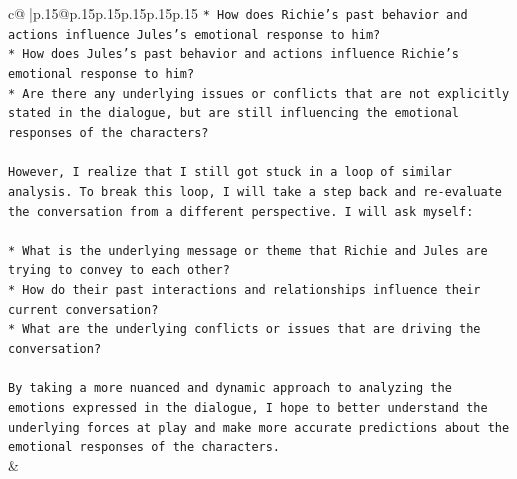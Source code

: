 \documentclass{article}
\begin{document}
{\begin{supertabular}{c@{$\;$}|p{.15\linewidth}@{}p{.15\linewidth}p{.15\linewidth}p{.15\linewidth}p{.15\linewidth}p{.15\linewidth}}
{{{\texttt{* How does Richie's past behavior and actions influence Jules's emotional response to him?} \\
\texttt{* How does Jules's past behavior and actions influence Richie's emotional response to him?} \\
\texttt{* Are there any underlying issues or conflicts that are not explicitly stated in the dialogue, but are still influencing the emotional responses of the characters?} \\
\\ 
\texttt{However, I realize that I still got stuck in a loop of similar analysis. To break this loop, I will take a step back and re{-}evaluate the conversation from a different perspective. I will ask myself:} \\
\\ 
\texttt{* What is the underlying message or theme that Richie and Jules are trying to convey to each other?} \\
\texttt{* How do their past interactions and relationships influence their current conversation?} \\
\texttt{* What are the underlying conflicts or issues that are driving the conversation?} \\
\\ 
\texttt{By taking a more nuanced and dynamic approach to analyzing the emotions expressed in the dialogue, I hope to better understand the underlying forces at play and make more accurate predictions about the emotional responses of the characters.} \\
            }
        }
    }
    & \\ \\

\end{supertabular}
}
\end{document}

